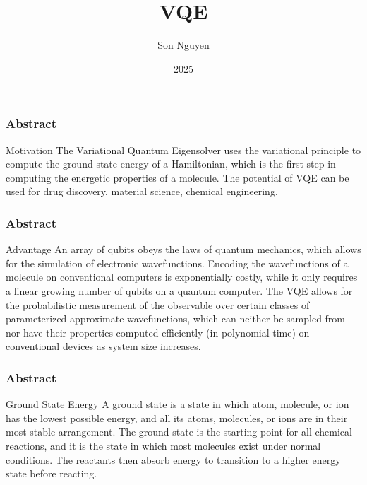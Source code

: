 \documentclass{beamer}
\title{VQE}
\author{Son Nguyen}
\institute{Stevens Institute of Technology}
\date{2025}
\begin{document}
\frame{\titlepage}
\begin{frame}
    \frametitle{Abstract}
    \begin{block}{Motivation}
        The Variational Quantum Eigensolver uses the variational principle to
         compute the ground state energy of a Hamiltonian, which is the first step in computing 
         the energetic properties of a molecule. The potential of VQE can be used for drug discovery,
         material science, chemical engineering.
    \end{block}
\end{frame}
\begin{frame}
    \frametitle{Abstract}
    \begin{block}{Advantage}
        An array of qubits obeys the laws of quantum mechanics, which allows for the simulation of electronic
         wavefunctions. Encoding the wavefunctions of a molecule on conventional computers is exponentially costly, while it only
         requires a linear growing number of qubits on a quantum computer. The VQE allows for the probabilistic measurement of the observable
         over certain classes of parameterized approximate wavefunctions, which can neither be sampled from nor have their properties computed efficiently (in polynomial time) on conventional devices
         as system size increases.
    \end{block}
\end{frame}

\begin{frame}
    \frametitle{Abstract}
    \begin{block}{Ground State Energy}
        A ground state is a state in which atom, molecule, or ion has the lowest possible energy, and all its atoms, molecules, or ions are in their most stable arrangement.
        The ground state is the starting point for all chemical reactions, and it is the state in which most molecules exist under normal conditions. The reactants then absorb energy to transition to a higher energy state before reacting.
    \end{block}
\end{frame}
\end{document}
